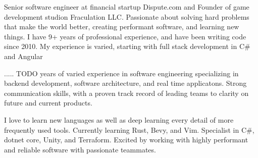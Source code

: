 

\begin{cvparagraph}

Senior software engineer at financial startup Dispute.com and Founder of game development studion Fraculation LLC.
Passionate about solving hard problems that make the world better, creating performant software, and learning new things.
I have 9+ years of professional experience, and have been writing code since 2010. My experience is varied, starting with 
full stack development in C\# and Angular

..... TODO
 years of varied experience in software engineering specializing in backend development, software architecture, and real time applicatons.
Strong communication skills, with a proven track record of leading teams to clarity on future and current products.

I love to learn new languages as well as deep learning every detail of more frequently used tools. Currently learning Rust, Bevy, and Vim. Specialist in C\#, dotnet core, Unity, and Terraform.
Excited by working with highly performant and reliable software with passionate teammates.

\end{cvparagraph}
